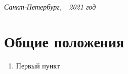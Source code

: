 \documentclass[a4paper,12pt]{article}
\begin{document}


\begin{flushright} {\it
	Санкт-Петербург,\ \ 2021 год}
\end{flushright}

\section{Общие положения}

\begin{enumerate}
	\item Первый пункт
\end{enumerate}
\end{document}
